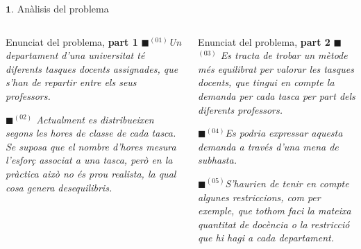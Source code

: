 \documentclass[twocolumn]{beamer}
\begin{document}
\begin{frame}{$\mathbf{1.}$ Anàlisis del problema}
\begin{columns}[t]
\begin{column}{.5\textwidth}
	\begin{block}{Enunciat del problema, \textbf{part 1}}
		\small
		\textit{{\color{cyan!60}$\blacksquare$}$^{(01)}${\color{black!80}Un departament d'una universitat té diferents tasques docents assignades, que s'han de repartir entre els seus professors.}}
		
		\textit{{\color{blue!60}$\blacksquare$}$^{(02)}$ Actualment es distribueixen segons les hores de classe de cada tasca. Se suposa que el nombre d'hores mesura l'esforç associat a una tasca, però en la pràctica això no és prou realista, la qual cosa genera desequilibris.}
	\end{block}
\end{column}
\begin{column}{.5\textwidth}
\begin{block}{Enunciat del problema, \textbf{part 2}}
	\small	
	 \textit{{\color{green!60}$\blacksquare$}$^{(03)}$ {\color{black!80}Es tracta de trobar un mètode més equilibrat per valorar les tasques docents, que tingui en compte la demanda per cada tasca per part dels diferents professors.}}
	 
	\textit{{\color{purple!60}$\blacksquare$}$^{(04)}$Es podria expressar aquesta demanda a través d'una mena de subhasta.}
	
	\textit{{\color{violet!60}$\blacksquare$}$^{(05)}${\color{black!80}S'haurien de tenir en compte algunes restriccions, com per exemple, que tothom faci la mateixa quantitat de docència o la restricció que hi hagi a cada departament.}}
\end{block}
\end{column}
\end{columns}
\end{frame}
\end{document}
